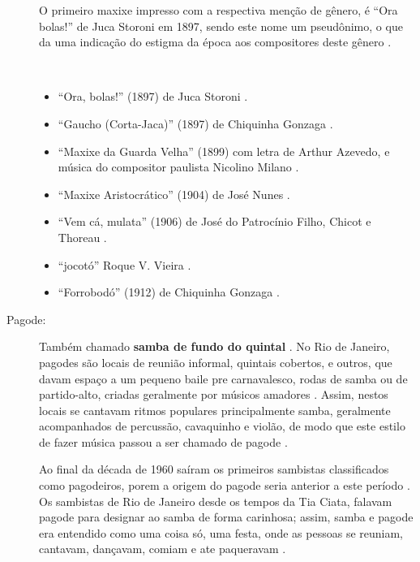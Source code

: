 \begin{description}
O primeiro maxixe impresso com a respectiva menção de gênero, é ``Ora bolas!'' de Juca Storoni em 1897,
sendo este nome um pseudônimo, o que da uma indicação do estigma da época aos compositores deste gênero \cite[pp. 80]{sandroni2001feitico} \cite[pp. 108]{efege1974maxixe}.

\begin{example} ~

\begin{itemize}
\item ``Ora, bolas!'' (1897) de Juca Storoni \cite[pp. 108]{efege1974maxixe}.
\item ``Gaucho (Corta-Jaca)'' (1897) de Chiquinha Gonzaga \cite{reportagemtvmaxixe} \cite[pp. 30]{efege1974maxixe}.
\item ``Maxixe da Guarda Velha'' (1899) com letra de Arthur Azevedo, 
e música do compositor paulista Nicolino Milano  \cite{reportagemtvmaxixe}. 
\item ``Maxixe Aristocrático'' (1904) de José Nunes \cite{REIS2003}.
\item ``Vem cá, mulata'' (1906) de José do Patrocínio Filho, Chicot e Thoreau \cite{REIS2003}.
\item ``jocotó'' Roque V. Vieira \cite{reportagemtvmaxixe}.
\item ``Forrobodó'' (1912) de Chiquinha Gonzaga \cite{REIS2003} \cite{reportagemtvmaxixe}.
\end{itemize}
\end{example}

\item[Pagode:] 
Também chamado \textbf{samba de fundo do quintal}  \cite[pp. 130]{perna2002samba}.
No Rio de Janeiro, pagodes são locais de reunião informal, quintais cobertos, e outros,
que davam espaço a um pequeno baile pre carnavalesco, 
rodas de samba ou de partido-alto, criadas geralmente por músicos amadores \cite[pp. 130]{perna2002samba} \cite[pp. 241]{dourado2004dicionario} \cite[pp. 241]{dourado2004dicionario}.
Assim, nestos locais se cantavam ritmos populares principalmente samba,
geralmente acompanhados de percussão, cavaquinho e violão, 
de modo que este  estilo de fazer música passou a ser chamado de pagode \cite[pp. 63]{reinato2010musica}  \cite[pp. 130]{perna2002samba}.

Ao final da década de 1960 saíram os primeiros sambistas classificados como pagodeiros,
porem a origem do pagode seria anterior a este período \cite{sedano2018bezerra}.
Os sambistas de Rio de Janeiro desde os tempos da Tia Ciata, 
falavam pagode para designar ao samba de forma carinhosa; 
assim, samba e pagode era entendido como uma coisa só, uma festa, 
onde as pessoas se reuniam, cantavam, dançavam, comiam e ate paqueravam \cite[pp. 209]{diniz2006almanaque}.


\end{description}
